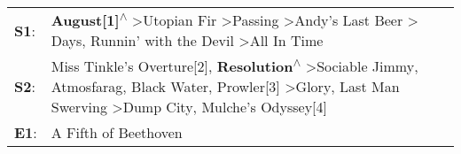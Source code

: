 \begin{supertabular}{p{0.03\textwidth}p{0.92\textwidth}}
 \textbf{S1}:  &                                                                                                                \textbf{August[1]\textsuperscript{$\wedge$}} \textgreater \enspace Utopian Fir\textsuperscript{} \textgreater \enspace Passing\textsuperscript{} \textgreater \enspace Andy's Last Beer\textsuperscript{} \textgreater {} Days\textsuperscript{}, \enspace Runnin' with the Devil\textsuperscript{} \textgreater \enspace All In Time\textsuperscript{}  \enspace  \\
 \textbf{S2}:  &  Miss Tinkle's Overture[2]\textsuperscript{}, \enspace \textbf{Resolution\textsuperscript{$\wedge$}} \textgreater \enspace Sociable Jimmy\textsuperscript{}, \enspace Atmosfarag\textsuperscript{}, \enspace Black Water\textsuperscript{}, \enspace Prowler[3]\textsuperscript{} \textgreater \enspace Glory\textsuperscript{}, \enspace Last Man Swerving\textsuperscript{} \textgreater \enspace Dump City\textsuperscript{}, \enspace Mulche's Odyssey[4]\textsuperscript{}  \enspace  \\
 \textbf{E1}:  &                                                                                                                                                                                                                                                                                                                                                                                                                                          A Fifth of Beethoven\textsuperscript{}  \enspace  \\
\end{supertabular}
